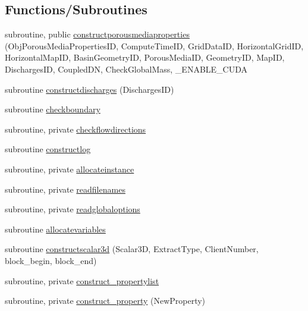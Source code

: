 \subsection*{Functions/\+Subroutines}
\begin{DoxyCompactItemize}
\item 
subroutine, public \mbox{\hyperlink{namespacemoduleporousmediaproperties_a3be1252bc0db9785b9746ae093d82a5f}{constructporousmediaproperties}} (Obj\+Porous\+Media\+Properties\+ID, Compute\+Time\+ID, Grid\+Data\+ID, Horizontal\+Grid\+ID, Horizontal\+Map\+ID, Basin\+Geometry\+ID, Porous\+Media\+ID, Geometry\+ID, Map\+ID, Discharges\+ID, Coupled\+DN, Check\+Global\+Mass, \+\_\+\+E\+N\+A\+B\+L\+E\+\_\+\+C\+U\+DA
\item 
subroutine \mbox{\hyperlink{namespacemoduleporousmediaproperties_a6b8ea609b75df890d6efecde90bff1ac}{constructdischarges}} (Discharges\+ID)
\item 
subroutine \mbox{\hyperlink{namespacemoduleporousmediaproperties_a9384815199fb37590dac347563039152}{checkboundary}}
\item 
subroutine, private \mbox{\hyperlink{namespacemoduleporousmediaproperties_a63ce83aa045cf918fb7c8218fc07ff62}{checkflowdirections}}
\item 
subroutine \mbox{\hyperlink{namespacemoduleporousmediaproperties_a2bfe4b92207b55cc4167ccce04ea859f}{constructlog}}
\item 
subroutine, private \mbox{\hyperlink{namespacemoduleporousmediaproperties_aa100fa334641d2574c9b2965459d3dbf}{allocateinstance}}
\item 
subroutine, private \mbox{\hyperlink{namespacemoduleporousmediaproperties_a97ca52cdaf883bec238ac8f6844e5871}{readfilenames}}
\item 
subroutine, private \mbox{\hyperlink{namespacemoduleporousmediaproperties_a9215099aea454d7ad22a07e69b0b6065}{readglobaloptions}}
\item 
subroutine \mbox{\hyperlink{namespacemoduleporousmediaproperties_a266292445f08da6a7567576e04444458}{allocatevariables}}
\item 
subroutine \mbox{\hyperlink{namespacemoduleporousmediaproperties_a720c9abb0cbd672dacfd23a18a959f50}{constructscalar3d}} (Scalar3D, Extract\+Type, Client\+Number, block\+\_\+begin, block\+\_\+end)
\item 
subroutine, private \mbox{\hyperlink{namespacemoduleporousmediaproperties_a0b617f6e3c622010d4230970529e87fb}{construct\+\_\+propertylist}}
\item 
subroutine, private \mbox{\hyperlink{namespacemoduleporousmediaproperties_a3cb901c1fa6f5b569ff3841c39531ce5}{construct\+\_\+property}} (New\+Property)

\end{DoxyCompactItemize}
